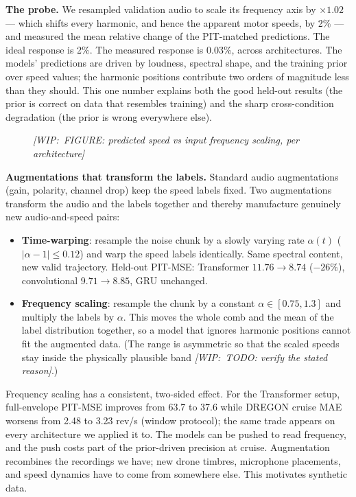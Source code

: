 \documentclass[journal]{IEEEtran}
\newcommand{\wip}[1]{{\color{gray!70!black}\textit{[WIP:~#1]}}}
\newcommand{\figbox}[1]{\framebox[\columnwidth]{\rule{0pt}{#1}}}
\begin{document}
\textbf{The probe.} We resampled validation audio to scale its frequency axis
by $\times 1.02$ --- which shifts every harmonic, and hence the apparent motor
speeds, by 2\% --- and measured the mean relative change of the PIT-matched
predictions. The ideal response is 2\%. The measured response is 0.03\%,
across architectures. The models' predictions are driven by loudness,
spectral shape, and the training prior over speed values; the harmonic
positions contribute two orders of magnitude less than they should. This one
number explains both the good held-out results (the prior is correct on data
that resembles training) and the sharp cross-condition degradation (the prior
is wrong everywhere else).

\begin{figure}[t]
  \centering
  \figbox{7em}
  \caption{\wip{FIGURE: predicted speed vs input frequency scaling, per
      architecture}}
  \label{fig:freq-probe}
\end{figure}

\textbf{Augmentations that transform the labels.} Standard audio
augmentations (gain, polarity, channel drop) keep the speed labels fixed. Two
augmentations transform the audio and the labels together and thereby
manufacture genuinely new audio-and-speed pairs:

\begin{itemize}
\item \textbf{Time-warping}: resample the noise chunk by a slowly varying
  rate $\alpha(t)$ ($|\alpha - 1| \le 0.12$) and warp the speed labels
  identically. Same spectral content, new valid trajectory. Held-out
  PIT-MSE: Transformer $11.76 \to 8.74$ ($-26\%$), convolutional
  $9.71 \to 8.85$, GRU unchanged.
\item \textbf{Frequency scaling}: resample the chunk by a constant
  $\alpha \in [0.75, 1.3]$ and multiply the labels by $\alpha$. This moves
  the whole comb and the mean of the label distribution together, so a model
  that ignores harmonic positions cannot fit the augmented data. (The range
  is asymmetric so that the scaled speeds stay inside the physically
  plausible band \wip{TODO: verify the stated reason}.)
\end{itemize}

Frequency scaling has a consistent, two-sided effect. For the Transformer
setup, full-envelope PIT-MSE improves from 63.7 to 37.6 while DREGON cruise
MAE worsens from 2.48 to 3.23 rev/s (window protocol); the same trade
appears on every architecture we applied it to. The models can be pushed to
read frequency, and the push costs part of the prior-driven precision at
cruise. Augmentation recombines the recordings we have; new drone timbres,
microphone placements, and speed dynamics have to come from somewhere else.
This motivates synthetic data.
\end{document}
